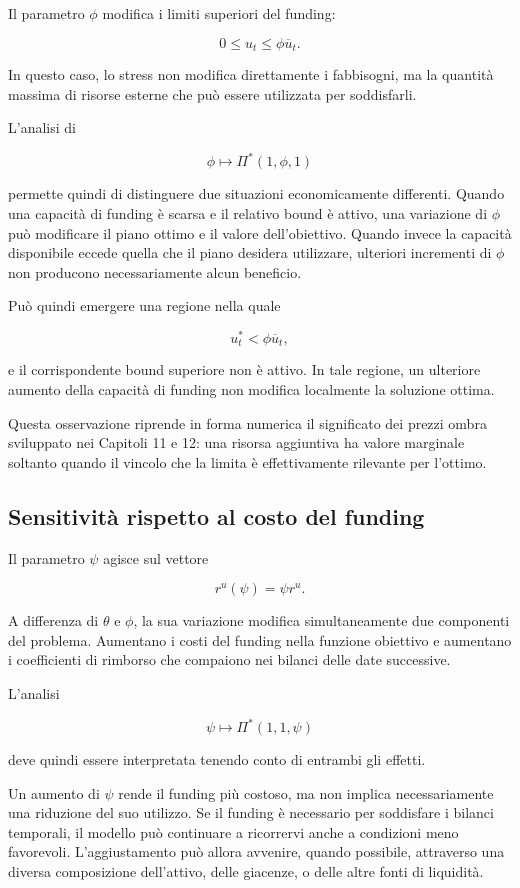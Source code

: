 Il parametro $\phi$ modifica i limiti superiori del funding:

\[
0
\leq
u_t
\leq
\phi\overline{u}_t.
\]

In questo caso, lo stress non modifica direttamente i fabbisogni, ma la
quantit\`a massima di risorse esterne che pu\`o essere utilizzata per
soddisfarli.

L'analisi di

\[
\phi
\longmapsto
\Pi^*(1,\phi,1)
\]

\noindent permette quindi di distinguere due situazioni economicamente differenti.
Quando una capacit\`a di funding \`e scarsa e il relativo bound \`e attivo,
una variazione di $\phi$ pu\`o modificare il piano ottimo e il valore
dell'obiettivo. Quando invece la capacit\`a disponibile eccede quella che il
piano desidera utilizzare, ulteriori incrementi di $\phi$ non producono
necessariamente alcun beneficio.

Pu\`o quindi emergere una regione nella quale

\[
u_t^*<\phi\overline{u}_t,
\]

\noindent e il corrispondente bound superiore non \`e attivo. In tale regione, un ulteriore aumento della capacit\`a di funding non modifica localmente la soluzione ottima.

Questa osservazione riprende in forma numerica il significato dei prezzi
ombra sviluppato nei Capitoli 11 e 12: una risorsa aggiuntiva ha valore
marginale soltanto quando il vincolo che la limita \`e effettivamente
rilevante per l'ottimo.

\subsection{Sensitivit\`a rispetto al costo del funding}

Il parametro $\psi$ agisce sul vettore

\[
r^u(\psi)
=
\psi r^u.
\]

A differenza di $\theta$ e $\phi$, la sua variazione modifica
simultaneamente due componenti del problema. Aumentano i costi del funding
nella funzione obiettivo e aumentano i coefficienti di rimborso che compaiono
nei bilanci delle date successive.

L'analisi

\[
\psi
\longmapsto
\Pi^*(1,1,\psi)
\]

\noindent deve quindi essere interpretata tenendo conto di entrambi gli effetti.

Un aumento di $\psi$ rende il funding pi\`u costoso, ma non implica necessariamente una riduzione del suo utilizzo. Se il funding \`e necessario per soddisfare i bilanci temporali, il modello pu\`o continuare a ricorrervi anche a condizioni meno favorevoli. L'aggiustamento pu\`o allora avvenire, quando possibile, attraverso una diversa composizione dell'attivo, delle giacenze, o delle altre fonti di liquidit\`a.

